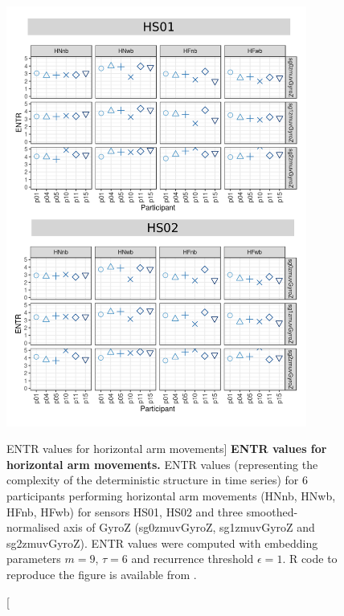 \begin{figure}
\centering
\includegraphics[width=0.88\textwidth]{rqa_entr_H_w500}
    \caption
	[ENTR values for horizontal arm movements]{
	{\bf ENTR values for horizontal arm movements.}
	ENTR values (representing the complexity of the deterministic 
	structure in time series) for 
	6 participants performing horizontal arm movements 
	(HNnb, HNwb, HFnb, HFwb)
	for sensors HS01, HS02 and three smoothed-normalised axis 
	of GyroZ (sg0zmuvGyroZ, sg1zmuvGyroZ and sg2zmuvGyroZ).
	ENTR values were computed with 
	embedding parameters $m=9$, $\tau=6$ and recurrence threshold
	$\epsilon=1$.
	R code to reproduce the figure is available from \cite{hwum2018}.
        }
    \label{fig:rqa_entr_H}
\end{figure}
